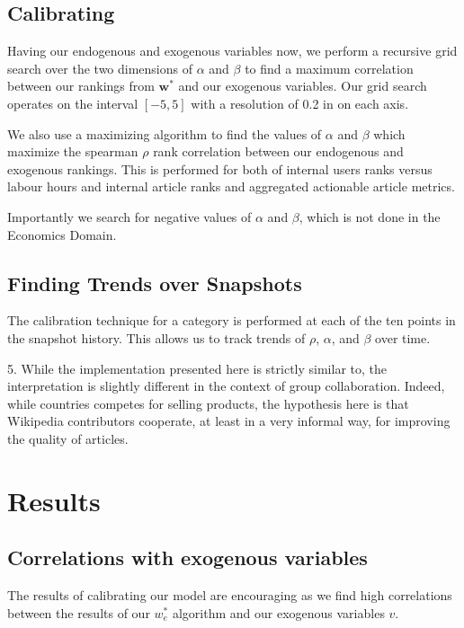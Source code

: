 \documentclass{acm_proc_article-sp}
\begin{document}
\subsection{Calibrating}

Having our endogenous and exogenous variables now, we perform a recursive grid search over the two dimensions of $\alpha$ and $\beta$ to find a maximum correlation between our rankings from $\mathbf{w^*}$ and our exogenous variables. Our grid search operates on the interval $[-5,5]$ with a resolution of 0.2 in on each axis.


We also use a maximizing algorithm to find the values of $\alpha$ and $\beta$ which maximize the spearman $\rho$ rank correlation between our endogenous and exogenous rankings. This is performed for both of internal users ranks versus labour hours and internal article ranks and aggregated actionable article metrics.

Importantly we search for negative values of $\alpha$ and $\beta$, which is not done in the Economics Domain.

\subsection{Finding Trends over Snapshots}

The calibration technique for a category is performed at each of the ten points in the snapshot history. This allows us to track trends of $\rho$, $\alpha$, and $\beta$ over time.



5. While the implementation presented here is strictly similar to, the interpretation is slightly different in the context of group collaboration. Indeed, while countries competes for selling products, the hypothesis here is that Wikipedia contributors cooperate, at least in a very informal way, for improving the quality of articles.




\section{Results}


\subsection{Correlations with exogenous variables}

The results of calibrating our model are encouraging as we find high correlations between the results of our $w^*_e$ algorithm and our exogenous variables $v$. 
\end{document}
